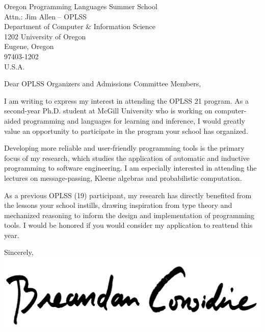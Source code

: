 \documentclass{letter}
\begin{document}
  \begin{letter}{Oregon Programming Languages Summer School\\Attn.: Jim Allen -- OPLSS\\Department of Computer \& Information Science\\1202 University of Oregon\\Eugene, Oregon\\97403-1202\\U.S.A.}
    \opening{Dear OPLSS Organizers and Admissions Committee Members,}
    I am writing to express my interest in attending the OPLSS \textsc{}21 program. As a second-year Ph.D. student at McGill University who is working on computer-aided programming and languages for learning and inference, I would greatly value an opportunity to participate in the program your school has organized.

    Developing more reliable and user-friendly programming tools is the primary focus of my research, which studies the application of automatic and inductive programming to software engineering. I am especially interested in attending the lectures on message-passing, Kleene algebras and probabilistic computation.

    As a previous  OPLSS (\textsc{}19) participant, my research has directly benefited from the lessons your school instills, drawing inspiration from type theory and mechanized reasoning to inform the design and implementation of programming tools. I would be honored if you would consider my application to reattend this year.
    \closing{Sincerely,\\
    \includegraphics[scale=0.06]{signature.png}\\
    }
  \end{letter}
\end{document}
